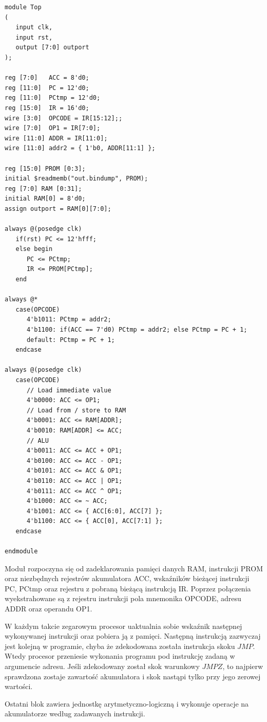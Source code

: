 \documentclass[a4paper,12pt]{article}
\begin{document}
\newpage

\begin{lstlisting}[label=CPU,caption=CPU.v]
module Top
(
   input clk,
   input rst,
   output [7:0] outport
);

reg [7:0]   ACC = 8'd0;
reg [11:0]  PC = 12'd0;
reg [11:0]  PCtmp = 12'd0;
reg [15:0]  IR = 16'd0;
wire [3:0]  OPCODE = IR[15:12];;
wire [7:0]  OP1 = IR[7:0];
wire [11:0] ADDR = IR[11:0];
wire [11:0] addr2 = { 1'b0, ADDR[11:1] };

reg [15:0] PROM [0:3];
initial $readmemb("out.bindump", PROM);
reg [7:0] RAM [0:31];
initial RAM[0] = 8'd0;
assign outport = RAM[0][7:0];

always @(posedge clk)
   if(rst) PC <= 12'hfff;
   else begin
      PC <= PCtmp;
      IR <= PROM[PCtmp];
   end

always @*
   case(OPCODE)
      4'b1011: PCtmp = addr2;
      4'b1100: if(ACC == 7'd0) PCtmp = addr2; else PCtmp = PC + 1;
      default: PCtmp = PC + 1;
   endcase

always @(posedge clk)
   case(OPCODE)
      // Load immediate value
      4'b0000: ACC <= OP1;
      // Load from / store to RAM
      4'b0001: ACC <= RAM[ADDR];
      4'b0010: RAM[ADDR] <= ACC;
      // ALU
      4'b0011: ACC <= ACC + OP1;
      4'b0100: ACC <= ACC - OP1;
      4'b0101: ACC <= ACC & OP1;
      4'b0110: ACC <= ACC | OP1;
      4'b0111: ACC <= ACC ^ OP1;
      4'b1000: ACC <= ~ ACC;
      4'b1001: ACC <= { ACC[6:0], ACC[7] };
      4'b1100: ACC <= { ACC[0], ACC[7:1] };
   endcase

endmodule
\end{lstlisting}


Moduł rozpoczyna się od zadeklarowania pamięci danych RAM, instrukcji PROM oraz niezbędnych rejestrów akumulatora ACC, wskaźników bieżącej instrukcji PC, PCtmp oraz rejestru z pobraną bieżącą instrukcją IR. Poprzez połączenia wyekstrahowane są z rejestru instrukcji pola mnemonika OPCODE, adresu ADDR oraz operandu OP1.

W każdym takcie zegarowym procesor uaktualnia sobie wskaźnik następnej wykonywanej instrukcji oraz pobiera ją z pamięci. Następną instrukcją zazwyczaj jest kolejną w programie, chyba że zdekodowana została instrukcja skoku $JMP$. Wtedy procesor przeniesie wykonania programu pod instrukcję zadaną w argumencie adresu. Jeśli zdekodowany został skok warunkowy $JMPZ$, to najpierw sprawdzona zostaje zawartość akumulatora i skok nastąpi tylko przy jego zerowej wartości.

Ostatni blok zawiera jednostkę arytmetyczno-logiczną i wykonuje operacje na akumulatorze według zadawanych instrukcji.
\end{document}
